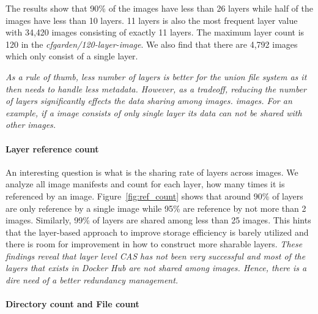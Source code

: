 The results show that 90\% of the images have less than 26 layers while half of
the images have less than 10 layers.
%
11 layers is also the most frequent layer value with 34,420 images consisting
of exactly 11 layers.
%
The maximum layer count is 120 in the \textit{cfgarden/120-layer-image}.
%
We also find that there are 4,792 images which only consist of a single layer.

\emph{As a rule of thumb, less number of layers is better for the union file
system as it then needs to handle less metadata. However, as a tradeoff,
reducing the number of layers significantly effects the data sharing among
images.
images.
%
For an example, if a image consists of only single layer its data can not be
shared with other images.}

%

\paragraph{Layer reference count}



An interesting question is what is the sharing rate of layers across images.
%
We analyze all image manifests and count for each layer, how many times it is
referenced by an image.
%
Figure~\ref{fig:ref_count} shows that around 90\% of layers are only reference
by a single image while 95\% are reference by not more than 2 images.
%
Similarly, 99\% of layers are shared among less than 25 images. 
%
%
This hints that the layer-based approach to improve storage efficiency is
barely utilized and there is room for improvement in how to construct more
sharable layers.
%
\emph{These findings reveal that layer level CAS has not been very successful
and most of the layers that exists in Docker Hub are not shared among images.
%
Hence, there is a dire need of a better redundancy management.}


\paragraph{Directory count and File count}

